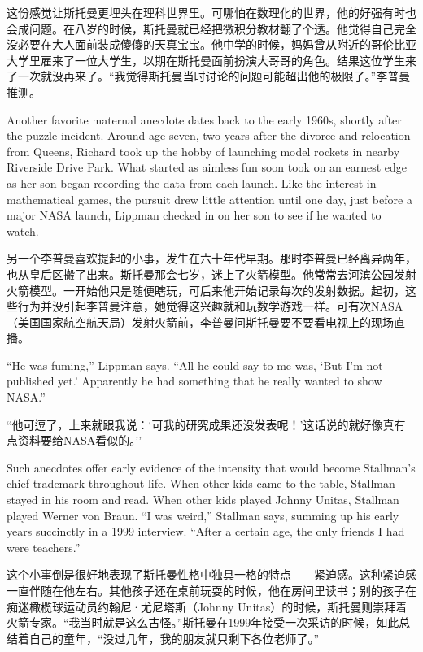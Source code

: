 \ifdefined\chs
这份感觉让斯托曼更埋头在理科世界里。可哪怕在数理化的世界，他的好强有时也会成问题。在八岁的时候，斯托曼就已经把微积分教材翻了个透。他觉得自己完全没必要在大人面前装成傻傻的天真宝宝。他中学的时候，妈妈曾从附近的哥伦比亚大学里雇来了一位大学生，以期在斯托曼面前扮演大哥哥的角色。结果这位学生来了一次就没再来了。``我觉得斯托曼当时讨论的问题可能超出他的极限了。''李普曼推测。
\fi

\ifdefined\eng
Another favorite maternal anecdote dates back to the early 1960s, shortly after the puzzle incident. Around age seven, two years after the divorce and relocation from Queens, Richard took up the hobby of launching model rockets in nearby Riverside Drive Park. What started as aimless fun soon took on an earnest edge as her son began recording the data from each launch. Like the interest in mathematical games, the pursuit drew little attention until one day, just before a major NASA launch, Lippman checked in on her son to see if he wanted to watch.
\fi

\ifdefined\chs
另一个李普曼喜欢提起的小事，发生在六十年代早期。那时李普曼已经离异两年，也从皇后区搬了出来。斯托曼那会七岁，迷上了火箭模型。他常常去河滨公园发射火箭模型。一开始他只是随便瞎玩，可后来他开始记录每次的发射数据。起初，这些行为并没引起李普曼注意，她觉得这兴趣就和玩数学游戏一样。可有次NASA（美国国家航空航天局）发射火箭前，李普曼问斯托曼要不要看电视上的现场直播。
\fi

\ifdefined\eng
``He was fuming,'' Lippman says. ``All he could say to me was, `But I'm not published yet.' Apparently he had something that he really wanted to show NASA.''
\fi

\ifdefined\chs
``他可逗了，上来就跟我说：`可我的研究成果还没发表呢！'这话说的就好像真有点资料要给NASA看似的。''
\fi

\ifdefined\eng
Such anecdotes offer early evidence of the intensity that would become Stallman's chief trademark throughout life. When other kids came to the table, Stallman stayed in his room and read. When other kids played Johnny Unitas, Stallman played Werner von Braun. ``I was weird,'' Stallman says, summing up his early years succinctly in a 1999 interview. ``After a certain age, the only friends I had were teachers.''%
\fi

\ifdefined\chs
这个小事倒是很好地表现了斯托曼性格中独具一格的特点——紧迫感。这种紧迫感一直伴随在他左右。其他孩子还在桌前玩耍的时候，他在房间里读书；别的孩子在痴迷橄榄球运动员约翰尼·尤尼塔斯（Johnny Unitas）的时候，斯托曼则崇拜着火箭专家。``我当时就是这么古怪。''斯托曼在1999年接受一次采访的时候，如此总结着自己的童年，``没过几年，我的朋友就只剩下各位老师了。'' %
\fi


